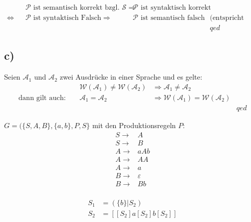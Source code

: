 \documentclass[a4paper,twoside]{HomeworkAssignment}
\begin{document}
\begin{align*}
&&\mathcal{P} \text{ ist semantisch korrekt bzgl. } \mathcal{S} \Rightarrow & \mathcal{P} \text{ ist syntaktisch korrekt}\\
\Leftrightarrow&&\mathcal{P} \text{ ist syntaktisch Falsch} \Rightarrow & \mathcal{P} \text{ ist semantisch falsch} & \text{(entspricht Def.)}\\
&&&&qed
\end{align*}
\subsection*{c)}
Seien $\mathcal{A}_1$ und $\mathcal{A}_2$ zwei Ausdrücke in einer Sprache und es gelte:
\begin{align*}
&&  \mathcal{W}(\mathcal{A}_1) \neq \mathcal{W}(\mathcal{A}_2) & \Rightarrow \mathcal{A}_1 \neq \mathcal{A}_2\\
\text{dann gilt auch: }&& \mathcal{A}_1 = \mathcal{A}_2 &  \Rightarrow \mathcal{W}(\mathcal{A}_1) = \mathcal{W}(\mathcal{A}_2) \\
&&&&qed 
\end{align*}

\newproblem[3] %

\newsubproblem
$G = (\{S,A,B\},\{a,b\},P,S\}$ mit den Produktionsregeln $P$:
\begin{align*}
  S \rightarrow & A \\
  S \rightarrow & B \\
  A \rightarrow & aAb\\
  A \rightarrow & AA\\
  A \rightarrow & a\\
  B \rightarrow & \varepsilon\\
  B \rightarrow & Bb\\
\end{align*}

\newsubproblem

\begin{align*}
S_1& = ( \{ b \} | S_2)\\
S_2& = [ [S_2] a [S_2] b [S_2] ]\\  
\end{align*}

\newpage
\newsubproblem
\end{document}
